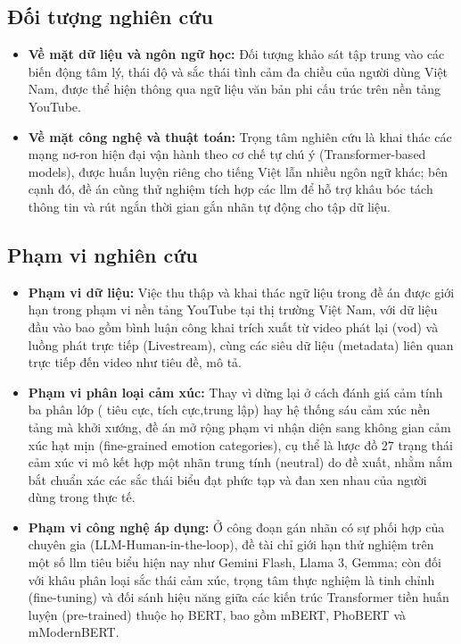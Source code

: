 \subsection{Đối tượng nghiên cứu}
\begin{itemize}[label=-]
    \item \textbf{Về mặt dữ liệu và ngôn ngữ học:} Đối tượng khảo sát tập trung vào các biến động tâm lý, thái độ và sắc thái tình cảm đa chiều của người dùng Việt Nam, được thể hiện thông qua ngữ liệu văn bản phi cấu trúc trên nền tảng YouTube.
    \item \textbf{Về mặt công nghệ và thuật toán:} Trọng tâm nghiên cứu là khai thác các mạng nơ-ron hiện đại vận hành theo cơ chế tự chú ý (Transformer-based models), được huấn luyện riêng cho tiếng Việt lẫn nhiều ngôn ngữ khác; bên cạnh đó, đề án cũng thử nghiệm tích hợp các \gls{llm} để hỗ trợ khâu bóc tách thông tin và rút ngắn thời gian gắn nhãn tự động cho tập dữ liệu.
\end{itemize}

\subsection{Phạm vi nghiên cứu}
\begin{itemize}[label=-]
    \item \textbf{Phạm vi dữ liệu:} Việc thu thập và khai thác ngữ liệu trong đề án được giới hạn trong phạm vi nền tảng YouTube tại thị trường Việt Nam, với dữ liệu đầu vào bao gồm bình luận công khai trích xuất từ video phát lại (\acrshort{vod}) và luồng phát trực tiếp (Livestream), cùng các siêu dữ liệu (metadata) liên quan trực tiếp đến video như tiêu đề, mô tả.
\item \textbf{Phạm vi phân loại cảm xúc:} Thay vì dừng lại ở cách đánh giá cảm tính ba phân lớp ( tiêu cực, tích cực,trung lập) hay hệ thống sáu cảm xúc nền tảng mà \textcite{ekman1992there} khởi xướng, đề án mở rộng phạm vi nhận diện sang không gian cảm xúc hạt mịn (fine-grained emotion categories), cụ thể là lược đồ 27 trạng thái cảm xúc vi mô kết hợp một nhãn trung tính (neutral) do \textcite{demszky2020goemotions} đề xuất, nhằm nắm bắt chuẩn xác các sắc thái biểu đạt phức tạp và đan xen nhau của người dùng trong thực tế.
    \item \textbf{Phạm vi công nghệ áp dụng:} Ở công đoạn gán nhãn có sự phối hợp của chuyên gia (LLM-Human-in-the-loop), đề tài chỉ giới hạn thử nghiệm trên một số \acrshort{llm} tiêu biểu hiện nay như Gemini Flash, Llama 3, Gemma; còn đối với khâu phân loại sắc thái cảm xúc, trọng tâm thực nghiệm là tinh chỉnh (fine-tuning) và đối sánh hiệu năng giữa các kiến trúc Transformer tiền huấn luyện (pre-trained) thuộc họ BERT, bao gồm mBERT, PhoBERT và mModernBERT.
\end{itemize}


